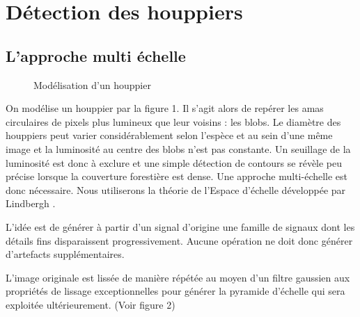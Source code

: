 \documentclass{article}
\begin{document}
\section{Détection des houppiers}

	\subsection{L'approche multi échelle}

	\begin{figure}
		\caption{Modélisation d'un houppier}
	 \end{figure}

	On modélise un houppier par la figure 1. Il s'agit alors de repérer les amas circulaires de pixels plus lumineux que leur voisins : les blobs. Le diamètre des houppiers peut varier considérablement selon l'espèce et au sein d'une même image et la luminosité au centre des blobs n'est pas constante. Un seuillage de la luminosité est donc à exclure et une simple détection de contours se révèle peu précise lorsque la couverture forestière est dense. Une approche multi-échelle est donc nécessaire. Nous utiliserons la théorie de l'Espace d'échelle développée par Lindbergh \cite{5}. 
	
	L'idée est de générer à partir d'un signal d'origine une famille de signaux dont les détails fins disparaissent progressivement. Aucune opération ne doit donc générer d'artefacts supplémentaires.  

	L'image originale est lissée de manière répétée au moyen d'un filtre gaussien aux propriétés de lissage exceptionnelles pour générer la pyramide d'échelle qui sera exploitée ultérieurement. (Voir figure 2)\\
	
\end{document}
